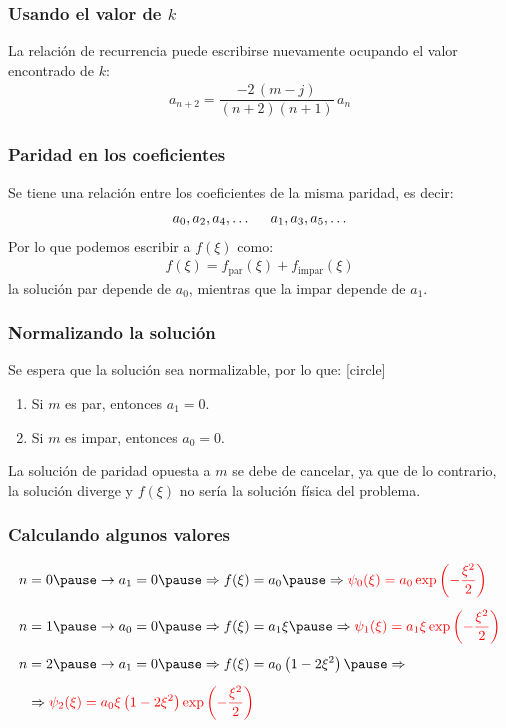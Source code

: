 \documentclass[12pt]{beamer}
\begin{document}
\begin{frame}
\frametitle{Usando el valor de $k$}
La relación de recurrencia puede escribirse nuevamente ocupando el valor encontrado de $k$:
\pause
\begin{align*}
a_{n+2} = \dfrac{-2 \, (m {-} j)}{(n {+} 2)(n {+} 1)} \, a_{n}
\end{align*}
\end{frame}
\begin{frame}
\frametitle{Paridad en los coeficientes}
Se tiene una relación entre los coeficientes de la misma paridad, es decir:
\begin{align*}
a_{0}, a_{2}, a_{4}, \ldots \hspace{0.5cm}
a_{1}, a_{3}, a_{5}, \ldots
\end{align*}
\pause
Por lo que podemos escribir a $f(\xi)$ como:
\pause
\begin{align*}
f(\xi) = f_{\mbox{par}} (\xi) + f_{\mbox{impar}} (\xi)
\end{align*}
la solución par depende de $a_{0}$, mientras que la impar depende de $a_{1}$.
\end{frame}
\begin{frame}
\frametitle{Normalizando la solución}
Se espera que la solución sea normalizable, por lo que:
[circle]
\begin{enumerate}[<+->]
\item Si $m$ es par, entonces $a_{1} = 0$.
\item Si $m$ es impar, entonces $a_{0} = 0$.
\end{enumerate}
\pause
La solución de paridad opuesta a $m$ se debe de cancelar, ya que de lo contrario, la solución diverge y $f(\xi)$ no sería la solución física del problema.
\end{frame}
\begin{frame}
\frametitle{Calculando algunos valores}
\begin{eqnarray*}
\begin{aligned}
n &= 0 \pause \rightarrow a_{1} = 0 \pause \Rightarrow f(\xi) = a_{0} \pause \Rightarrow \textcolor{red}{\psi_{0}(\xi) = a_{0} \exp \left( - \dfrac{\xi^{2}}{2} \right)} \\[0.5em]
n &= 1 \pause \rightarrow a_{0} = 0 \pause \Rightarrow f(\xi) = a_{1} \xi \pause \Rightarrow \textcolor{red}{\psi_{1}(\xi) = a_{1} \xi \exp \left( - \dfrac{\xi^{2}}{2} \right)} \\[0.5em]
n &= 2 \pause \rightarrow a_{1} = 0 \pause \Rightarrow f(\xi) = a_{0} \left( 1 - 2 \xi^{2} \right) \pause \Rightarrow \\[0.5em]
&\Rightarrow \textcolor{red}{\psi_{2}(\xi) = a_{0} \xi \left( 1 - 2 \xi^{2} \right) \exp \left( - \dfrac{\xi^{2}}{2} \right)}
\end{aligned}
\end{eqnarray*}
\end{frame}
\end{document}
